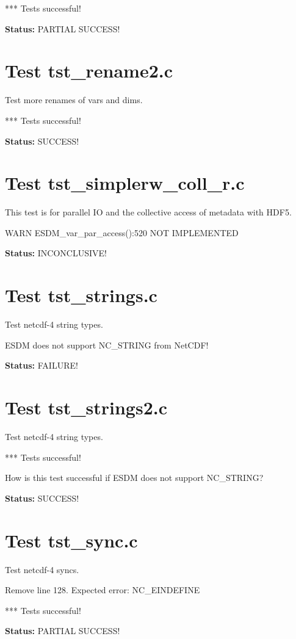 *** Tests successful!

{\bf \large Status: } PARTIAL SUCCESS!

\section{Test tst\_rename2.c}

Test more renames of vars and dims.

*** Tests successful!

{\bf \large Status: } SUCCESS!

\section{Test tst\_simplerw\_coll\_r.c}

This test is for parallel IO and the collective access of metadata with HDF5.

WARN ESDM\_var\_par\_access():520 NOT IMPLEMENTED

{\bf \large Status: } INCONCLUSIVE!

\section{Test tst\_strings.c}

Test netcdf-4 string types.

ESDM does not support NC\_STRING from NetCDF!

{\bf \large Status: } FAILURE!

\section{Test tst\_strings2.c}

Test netcdf-4 string types.

*** Tests successful!

How is this test successful if ESDM does not support NC\_STRING?

{\bf \large Status: } SUCCESS!

\section{Test tst\_sync.c}

Test netcdf-4 syncs.

Remove line 128. Expected error: NC\_EINDEFINE

*** Tests successful!

{\bf \large Status: } PARTIAL SUCCESS!

